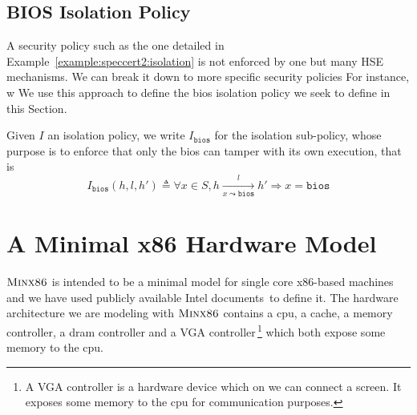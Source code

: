 \subsection{BIOS Isolation Policy}
\label{subsec:speccert:biossec}

A security policy such as the one detailed in
Example~\ref{example:speccert2:isolation} is not enforced by one but many HSE
mechanisms.
%
We can break it down to more specific security policies
%
For instance, w
We use this approach to define the \ac{bios} isolation policy we seek to define
in this Section.

\begin{definition}
  \label{def:speccert:biospol}
  Given $I$ an isolation policy, we write $I_{\mathtt{bios}}$ for the isolation
  sub-policy, whose purpose is to enforce that only the \ac{bios} can tamper
  with its own execution, that is
  \[
    I_{\mathtt{bios}}(h, l, h') \triangleq \forall x \in S, h \xrightarrow[x
    \leadsto \mathtt{bios}]{l} h' \Rightarrow x = \mathtt{bios}
  \]
\end{definition}

%

\section{A Minimal x86 Hardware Model}
\label{sec:speccert2:minx86}

$\textsc{Minx86}$ is intended to be a minimal model for single core x86-based
machines and we have used publicly available Intel
documents\,\cite{intel2013celeron,intel2009mch,intel2014manual} to define it.
%
The hardware architecture we are modeling with $\textsc{Minx86}$ contains a
\ac{cpu}, a cache, a memory controller, a \ac{dram} controller and a VGA
controller\,\footnote{A VGA controller is a hardware device which on we can
  connect a screen. It exposes some memory to the \ac{cpu} for communication
  purposes.} which both expose some memory to the \ac{cpu}.


